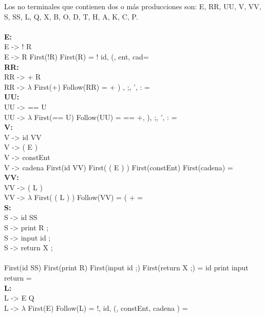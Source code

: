\documentclass{article}[a4paper]
\newcommand\tab[1][1cm]{\hspace*{#1}}
\begin{document}
Los no terminales que contienen dos o más producciones son: E, RR, UU, V, VV, S, SS, L, Q, X, B, O, D, T, H, A, K, C, P.\\ \\

\textbf{E:}\\
\tab E -> ! R\\ \tab E -> R
\tab \tab \tab First(!R) \cap  First(R) = \lbrace ! \rbrace \cap  \lbrace id, (, ent, cad\rbrace = \emptyset \\

\textbf{RR:}\\
\tab RR -> + R \\ \tab RR -> $\lambda$
\tab \tab First(+) \cap  Follow(RR) = \lbrace + \rbrace \cap \lbrace ) , ;, ', : \rbrace = \emptyset \\

\textbf{UU:}\\
\tab UU -> == U\\ \tab UU -> $\lambda$
\tab \tab First(== U) \cap  Follow(UU) = \lbrace == \rbrace \cap  \lbrace +, ), ;, ', : \rbrace = \emptyset \\

\textbf{V:}\\
\tab V -> id VV\\ \tab V -> ( E )\\ \tab V -> constEnt\\ \tab V -> cadena
\tab \tab First(id VV) \cap  First( ( E ) ) \cap First(constEnt) \cap First(cadena) = \emptyset \\

\textbf{VV:}\\
\tab VV -> ( L ) \\ \tab VV -> $\lambda$
\tab \tab First( ( L ) ) \cap  Follow(VV) = \lbrace ( \rbrace \cap \lbrace + \rbrace = \emptyset \\

\textbf{S:}\\
\tab S -> id SS \\ \tab S -> print R ; \\ \tab S -> input id ; \\ \tab S -> return X ; \\ \\
\tab \tab First(id SS) \cap  First(print R) \cap First(input id ;) \cap First(return X ;) = \lbrace id \rbrace \cap \lbrace print \rbrace \cap \lbrace input \rbrace \cap \lbrace return \rbrace = \emptyset \\

\textbf{L:}\\
\tab L -> E Q \\ \tab L -> $\lambda$
\tab \tab First(E) \cap  Follow(L) = \lbrace !, id, (, constEnt, cadena \rbrace \cap \lbrace ) \rbrace = \emptyset \\
\end{document}

